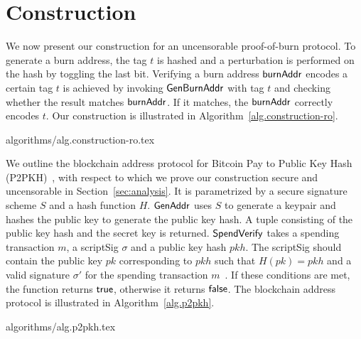 \section{Construction}\label{sec:construction}
We now present our construction for an uncensorable proof-of-burn protocol. To generate a burn address, the tag $t$ is hashed and a perturbation is performed on the hash by toggling the last bit.
Verifying a burn address $\mathsf{burnAddr}$ encodes a certain tag $t$ is achieved by invoking $\mathsf{Gen}\-\mathsf{Burn}\-\mathsf{Addr}$ with tag $t$ and checking whether the result matches $\mathsf{burnAddr}$. If it matches, the $\mathsf{burnAddr}$ correctly encodes $t$. Our construction is illustrated in Algorithm~\ref{alg.construction-ro}.

{algorithms/alg.construction-ro.tex}

We outline the blockchain address protocol for Bitcoin Pay to Public Key Hash (P2PKH)~\cite{bitcoin-dev-guide}, with respect to which we prove our construction secure and uncensorable in Section~\ref{sec:analysis}. It is parametrized by a secure signature scheme $S$ and a hash function $H$.
$\mathsf{GenAddr}$ uses $S$ to generate a keypair and hashes the public key to generate the public key hash. A tuple consisting of the public key hash and the secret key is returned.
$\mathsf{SpendVerify}$ takes a spending transaction $m$, a scriptSig $\sigma$ and a public key hash $pkh$. The scriptSig should contain the public key $pk$ corresponding to $pkh$ such that $H(pk) = pkh$ and a valid signature $\sigma'$ for the spending transaction $m$~\cite{bitcoin-dev-guide}. If these conditions are met, the function returns $\mathsf{true}$, otherwise it returns $\mathsf{false}$.
The blockchain address protocol is illustrated in Algorithm~\ref{alg.p2pkh}.

{algorithms/alg.p2pkh.tex}
